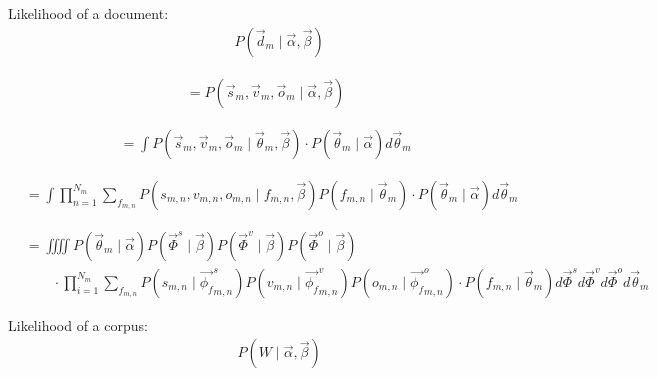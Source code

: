 \documentclass{article}
\begin{document}
\noindent Likelihood of a document:
\begin{equation}
\begin{aligned}
&\qquad P(\vec{d}_m \mid \vec{\alpha}, \vec{\beta})
\end{aligned}
\end{equation}

\begin{equation}
\begin{aligned}
&= P(\vec{s}_m, \vec{v}_m, \vec{o}_m \mid \vec{\alpha}, \vec{\beta})
\end{aligned}
\end{equation}

\begin{equation}
\begin{aligned}
&= \int P(\vec{s}_m, \vec{v}_m, \vec{o}_m \mid \vec{\theta}_m, \vec{\beta}) \cdot
P(\vec{\theta}_m \mid \vec{\alpha}) d\vec{\theta}_m 
\end{aligned}
\end{equation}

\begin{equation}
\begin{aligned}
&= \int \prod_{n=1}^{N_m}\sum_{f_{m,n}} P(s_{m,n}, v_{m,n}, o_{m,n} \mid f_{m,n}, \vec{\beta}) P(f_{m,n} \mid \vec{\theta}_m) \cdot P(\vec{\theta}_m \mid \vec{\alpha}) d\vec{\theta}_m
\end{aligned}
\end{equation}

\begin{equation}
\begin{aligned}
&= \iiiint  
P(\vec{\theta}_m \mid \vec{\alpha})
P(\vec{\Phi}^s \mid \vec{\beta})
P(\vec{\Phi}^v \mid \vec{\beta})
P(\vec{\Phi}^o \mid \vec{\beta}) \\
&\qquad\cdot  \prod_{i=1}^{N_m} 
\sum_{f_{m,n}}
P(s_{m,n} \mid \vec{\phi_{f}}_{m,n}^s)
P(v_{m,n} \mid \vec{\phi_{f}}_{m,n}^v)
P(o_{m,n} \mid \vec{\phi_{f}}_{m,n}^o) 
\cdot 
P(f_{m,n} \mid \vec{\theta}_m)
d\vec{\Phi}^s
d\vec{\Phi}^v
d\vec{\Phi}^o
d\vec{\theta}_m 
\end{aligned}
\end{equation}



\noindent Likelihood of a corpus:
\begin{equation}
\begin{aligned}
&\qquad P(W \mid \vec{\alpha}, \vec{\beta}) 
\end{aligned}
\end{equation}
\end{document}
